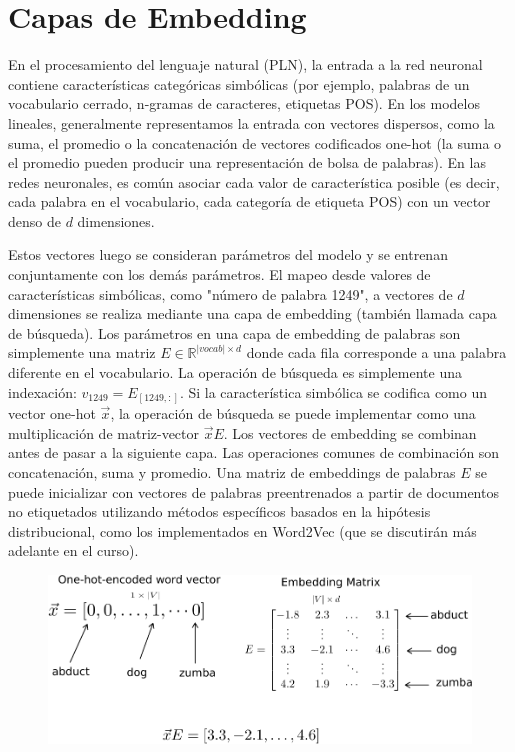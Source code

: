 
\section{Capas de Embedding}
En el procesamiento del lenguaje natural (PLN), la entrada a la red neuronal contiene características categóricas simbólicas (por ejemplo, palabras de un vocabulario cerrado, n-gramas de caracteres, etiquetas POS). En los modelos lineales, generalmente representamos la entrada con vectores dispersos, como la suma, el promedio o la concatenación de vectores codificados one-hot (la suma o el promedio pueden producir una representación de bolsa de palabras). En las redes neuronales, es común asociar cada valor de característica posible (es decir, cada palabra en el vocabulario, cada categoría de etiqueta POS) con un vector denso de $d$ dimensiones.

Estos vectores luego se consideran parámetros del modelo y se entrenan conjuntamente con los demás parámetros. El mapeo desde valores de características simbólicas, como "número de palabra 1249", a vectores de $d$ dimensiones se realiza mediante una capa de embedding (también llamada capa de búsqueda). Los parámetros en una capa de embedding de palabras son simplemente una matriz $E \in \mathbb{R}^{|vocab|\times d}$ donde cada fila corresponde a una palabra diferente en el vocabulario. La operación de búsqueda es simplemente una indexación: $v_{1249} = E_{[1249,:]}$. Si la característica simbólica se codifica como un vector one-hot $\vec{x}$, la operación de búsqueda se puede implementar como una multiplicación de matriz-vector $\vec{x}E$. Los vectores de embedding se combinan antes de pasar a la siguiente capa. Las operaciones comunes de combinación son concatenación, suma y promedio. Una matriz de embeddings de palabras $E$ se puede inicializar con vectores de palabras preentrenados a partir de documentos no etiquetados utilizando métodos específicos basados en la hipótesis distribucional, como los implementados en Word2Vec (que se discutirán más adelante en el curso).

\begin{figure}[htb]
	\centering
	 \includegraphics[scale=0.65]{pics/emb_matrix.pdf}
\end{figure}

